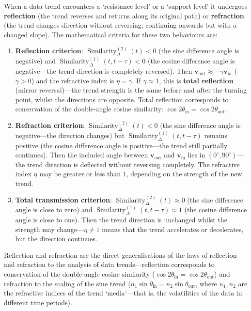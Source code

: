 \begin{definition}\label{def:reflection_refraction_trend}
When a data trend encounters a `resistance level' or a `support level' it undergoes \textbf{reflection} (the trend reverses and returns along its original path) or \textbf{refraction} (the trend changes direction without reversing, continuing onwards but with a changed slope). The mathematical criteria for these two behaviours are:
\begin{enumerate}[label=(\roman*)]
    \item \textbf{Reflection criterion}: $\operatorname{Similarity}^{(2)}_{\Delta}(t) < 0$ (the sine difference angle is negative) and $\operatorname{Similarity}^{(1)}_{\Delta}(t, t-\tau) < 0$ (the cosine difference angle is negative---the trend direction is completely reversed). Then $\mathbf{v}_{\text{out}} \approx -\gamma \mathbf{v}_{\text{in}}$ ($\gamma > 0$) and the refractive index is $\eta = \gamma$. If $\gamma \approx 1$, this is \textbf{total reflection} (mirror reversal)---the trend strength is the same before and after the turning point, whilst the directions are opposite. Total reflection corresponds to conservation of the double-angle cosine similarity: $\cos 2\theta_{\text{in}} = \cos 2\theta_{\text{out}}$.
    \item \textbf{Refraction criterion}: $\operatorname{Similarity}^{(2)}_{\Delta}(t) < 0$ (the sine difference angle is negative---the direction changes) but $\operatorname{Similarity}^{(1)}_{\Delta}(t, t-\tau)$ remains positive (the cosine difference angle is positive---the trend still partially continues). Then the included angle between $\mathbf{v}_{\text{out}}$ and $\mathbf{v}_{\text{in}}$ lies in $(0^\circ, 90^\circ)$---the trend direction is deflected without reversing completely. The refractive index $\eta$ may be greater or less than $1$, depending on the strength of the new trend.
    \item \textbf{Total transmission criterion}: $\operatorname{Similarity}^{(2)}_{\Delta}(t) \approx 0$ (the sine difference angle is close to zero) and $\operatorname{Similarity}^{(1)}_{\Delta}(t, t-\tau) \approx 1$ (the cosine difference angle is close to one). Then the trend direction is unchanged whilst the strength may change---$\eta \neq 1$ means that the trend accelerates or decelerates, but the direction continues.
\end{enumerate}
Reflection and refraction are the direct generalisations of the laws of reflection and refraction to the analysis of data trends---reflection corresponds to conservation of the double-angle cosine similarity ($\cos 2\theta_{\text{in}} = \cos 2\theta_{\text{out}}$) and refraction to the scaling of the sine trend ($n_1 \sin\theta_{\text{in}} = n_2 \sin\theta_{\text{out}}$, where $n_1, n_2$ are the refractive indices of the trend `media'---that is, the volatilities of the data in different time periods).
\end{definition}

